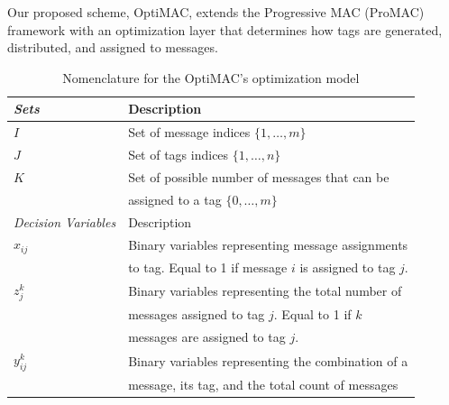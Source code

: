 Our proposed scheme, OptiMAC, extends the Progressive MAC (ProMAC) framework
with an optimization layer that determines how tags are generated, distributed,
and assigned to messages.

\begin{table} [htbp]
        
	\footnotesize
	\begin{center}
		\caption{\small Nomenclature for the OptiMAC's optimization model} \label{tab:nomenclature}
		\vspace{1ex} {
			\begin{tabular}{|l|l|}
				\hline
				\it{Sets} & {Description}\\ \hline
				$I$ &  Set of message indices $\{1,\ldots,m\}$ \\
				$J$ & Set of tags indices $\{1,\ldots,n \}$  \\
                    $K$ & Set of possible number of messages that can be  \\
                        & assigned to a tag $\{0,\ldots, m\}$  \\
				\hline\it{Decision Variables} & {Description}\\ \hline
				$x_{ij}$  & Binary variables representing message assignments \\
         				   & to tag. Equal to 1 if message $i$ is assigned to tag $j$. \\
                    $z_{j}^k$ & Binary variables representing the total number of\\
                              & messages assigned to tag $j$. Equal to 1 if $k$ \\
                              &  messages are assigned to tag $j$.\\
                    $y_{ij}^k$ & Binary variables representing the combination of a \\
                               & message, its tag, and the total count of messages\\

\end{tabular}}
\end{center}
\end{table}
